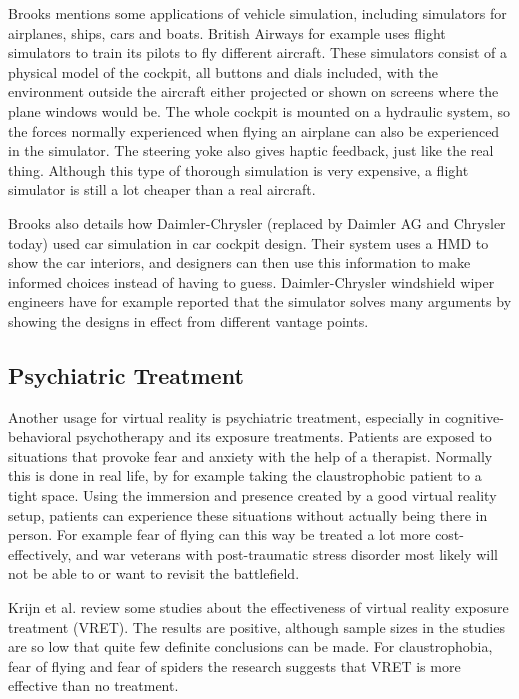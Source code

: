 \documentclass[12pt,a4paper,oneside,pdftex]{report}
\begin{document}
Brooks \cite{brooks1999whatsreal} mentions some applications of vehicle simulation, including simulators for airplanes, ships, cars and boats. British Airways for example uses flight simulators to train its pilots to fly different aircraft. These simulators consist of a physical model of the cockpit, all buttons and dials included, with the environment outside the aircraft either projected or shown on screens where the plane windows would be. The whole cockpit is mounted on a hydraulic system, so the forces normally experienced when flying an airplane can also be experienced in the simulator. The steering yoke also gives haptic feedback, just like the real thing. Although this type of thorough simulation is very expensive, a flight simulator is still a lot cheaper than a real aircraft.

Brooks also details how Daimler-Chrysler (replaced by Daimler AG and Chrysler today) used car simulation in car cockpit design. Their system uses a HMD to show the car interiors, and designers can then use this information to make informed choices instead of having to guess. Daimler-Chrysler windshield wiper engineers have for example reported that the simulator solves many arguments by showing the designs in effect from different vantage points.

\subsection{Psychiatric Treatment}
\label{subsection:applications:psychiatric}

Another usage for virtual reality is psychiatric treatment, especially in cognitive-behavioral psychotherapy and its exposure treatments. Patients are exposed to situations that provoke fear and anxiety with the help of a therapist. Normally this is done in real life, by for example taking the claustrophobic patient to a tight space. Using the immersion and presence created by a good virtual reality setup, patients can experience these situations without actually being there in person. For example fear of flying can this way be treated a lot more cost-effectively, and war veterans with post-traumatic stress disorder most likely will not be able to or want to revisit the battlefield.

Krijn et al. \cite{krijn2004virtual} review some studies about the effectiveness of virtual reality exposure treatment (VRET). The results are positive, although sample sizes in the studies are so low that quite few definite conclusions can be made. For claustrophobia, fear of flying and fear of spiders the research suggests that VRET is more effective than no treatment.
\end{document}
